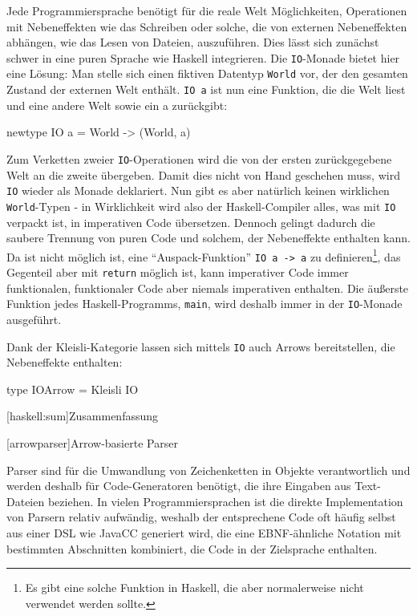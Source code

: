 \documentclass[11pt, a4paper, bibgerm]{book}
\newcommand\icode[1]{\lstinline?#1?}
\newcommand\lchapter{}
\newcommand\lsection{}
\begin{document}
Jede Programmiersprache benötigt für die reale Welt Möglichkeiten,
Operationen mit Nebeneffekten wie das Schreiben oder solche, die von
externen Nebeneffekten abhängen, wie das Lesen von Dateien,
auszuführen. Dies lässt sich zunächst schwer in eine puren Sprache wie
Haskell integrieren. Die \icode{IO}-Monade bietet hier eine Lösung: Man
stelle sich einen fiktiven Datentyp \icode{World} vor, der den gesamten
Zustand der externen Welt enthält. \icode{IO a} ist nun eine Funktion,
die die Welt liest und eine andere Welt sowie ein a zurückgibt:
\begin{code}
newtype IO a = World -> (World, a)
\end{code}
Zum Verketten zweier \icode{IO}-Operationen wird die von der ersten
zurückgegebene Welt an die zweite übergeben. Damit dies nicht von Hand
geschehen muss, wird \icode{IO} wieder als Monade deklariert. Nun gibt
es aber natürlich keinen wirklichen \icode{World}-Typen - in
Wirklichkeit wird also der Haskell-Compiler alles, was mit \icode{IO}
verpackt ist, in imperativen Code übersetzen. Dennoch gelingt dadurch
die saubere Trennung von puren Code und solchem, der Nebeneffekte
enthalten kann. Da ist nicht möglich ist, eine "`Auspack-Funktion"'
\icode{IO a -> a} zu definieren\footnote{Es gibt eine solche Funktion in
  Haskell, die aber normalerweise nicht verwendet werden sollte.}, das
Gegenteil aber mit \icode{return} möglich ist, kann imperativer Code
immer funktionalen, funktionaler Code aber niemals imperativen
enthalten. Die äußerste Funktion jedes Haskell-Programms, \icode{main},
wird deshalb immer in der \icode{IO}-Monade ausgeführt.

Dank der Kleisli-Kategorie lassen sich mittels \icode{IO} auch Arrows
bereitstellen, die Nebeneffekte enthalten:
\begin{code}
type IOArrow = Kleisli IO
\end{code}

\lsection[haskell:sum]{Zusammenfassung}

\lchapter[arrowparser]{Arrow-basierte Parser}

Parser sind für die Umwandlung von Zeichenketten in Objekte
verantwortlich und werden deshalb für Code-Generatoren benötigt, die
ihre Eingaben aus Text-Dateien beziehen. In vielen Programmiersprachen
ist die direkte Implementation von Parsern relativ aufwändig, weshalb
der entsprechene Code oft häufig selbst aus einer DSL wie JavaCC
generiert wird, die eine EBNF-ähnliche Notation mit bestimmten
Abschnitten kombiniert, die Code in der Zielsprache enthalten.
\end{document}
